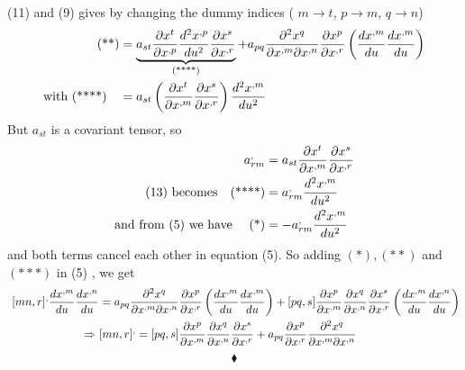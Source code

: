 (11) and (9) gives by changing the dummy indices ( $m\rightarrow t$, $p\rightarrow m$, $q\rightarrow n$)
\begin{align}
\text{(**)}&= \underbrace{a_{st}\pdv{x^t}{x^{,p}}\dv[2]{x^{,p}}{u}\pdv{x^s}{x^{,r}}}_\text{(****)}+a_{pq}\pdv{x^q}{x^{,m}}{x^{,n}}\pdv{x^{p}}{x^{,r}}\left(\dv{x^{,m}}{u}\dv{x^{,m}}{u}\right) \\
\text{with (****)}\quad &= a_{st}\left(\pdv{x^t}{x^{,m}}\pdv{x^s}{x^{,r}}\right)\dv[2]{x^{,m}}{u}
\end{align}
But $a_{st}$  is a covariant tensor, so
\begin{align}
\ a^{,}_{rm} &= a_{st}\pdv{x^t}{x^{,m}}\pdv{x^s}{x^{,r}}\\
\text{(13) becomes}\quad \text{(****)} &= a^{,}_{rm}\dv[2]{x^{,m}}{u}\\
\text{and from (5) we have }\quad \text{(*)} &= -a^{,}_{rm}\dv[2]{x^{,m}}{u}\\
\end{align}
and both terms cancel each other in equation (5). So adding $(*), (**)$ and $(***)$ in (5) , we get 
\begin{align}
\ [mn,r]^, \dv{x^{,m}}{u}\dv{x^{,n}}{u} &= a_{pq}\pdv{x^q}{x^{,m}}{x^{,n}}\pdv{x^{p}}{x^{,r}}\left(\dv{x^{,m}}{u}\dv{x^{,m}}{u}\right)+[pq,s]\pdv{x^p}{x^{,m}}\pdv{x^q}{x^{,n}}\pdv{x^s}{x^{,r}}\left(\dv{x^{,m}}{u}\dv{x^{,n}}{u}\right)\\
\Rightarrow \ &[mn,r]^, =[pq,s]\pdv{x^p}{x^{,m}}\pdv{x^q}{x^{,n}}\pdv{x^s}{x^{,r}}+  a_{pq}\pdv{x^{p}}{x^{,r}}\pdv{x^q}{x^{,m}}{x^{,n}}
\end{align}
$$\blacklozenge$$
\newpage

